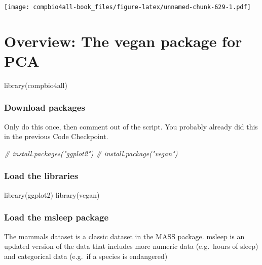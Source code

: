 \documentclass[
]{book}
\newenvironment{Shaded}{\begin{snugshade}}{\end{snugshade}}
\newcommand{\CommentTok}[1]{\textcolor[rgb]{0.56,0.35,0.01}{\textit{#1}}}
\newcommand{\FunctionTok}[1]{\textcolor[rgb]{0.00,0.00,0.00}{#1}}
\newcommand{\NormalTok}[1]{#1}
\begin{document}
\texttt{[image: compbio4all-book\_files/figure-latex/unnamed-chunk-629-1.pdf]}

\hypertarget{overview-the-vegan-package-for-pca}{%
\chapter{Overview: The vegan package for PCA}\label{overview-the-vegan-package-for-pca}}

\begin{Shaded}
\begin{Highlighting}[]
\FunctionTok{library}\NormalTok{(compbio4all)}
\end{Highlighting}
\end{Shaded}

\hypertarget{download-packages}{%
\subsection{Download packages}\label{download-packages}}

Only do this once, then comment out of the script. You probably already did this in the previous Code Checkpoint.

\begin{Shaded}
\begin{Highlighting}[]
\CommentTok{\# install.packages("ggplot2")}
\CommentTok{\# install.package("vegan")}
\end{Highlighting}
\end{Shaded}

\hypertarget{load-the-libraries-3}{%
\subsection{Load the libraries}\label{load-the-libraries-3}}

\begin{Shaded}
\begin{Highlighting}[]
\FunctionTok{library}\NormalTok{(ggplot2)}
\FunctionTok{library}\NormalTok{(vegan)}
\end{Highlighting}
\end{Shaded}

\hypertarget{load-the-msleep-package-3}{%
\subsection{Load the msleep package}\label{load-the-msleep-package-3}}

The mammals dataset is a classic dataset in the MASS package. msleep is an updated version of the data that includes more numeric data (e.g.~hours of sleep) and categorical data (e.g.~if a species is endangered)
\end{document}
